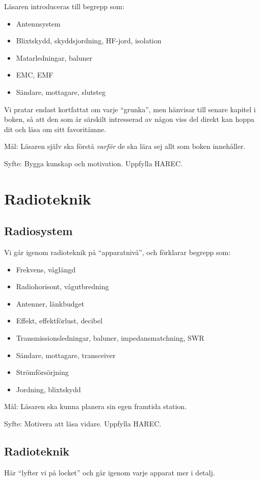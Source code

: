 \documentclass[a4paper,twoside,openright]{book}
\begin{document}
Läsaren introduceras till begrepp som:
\begin{itemize}
\item Antennsystem
\item Blixtskydd, skyddsjordning, HF-jord, isolation
\item Matarledningar, baluner
\item EMC, EMF
\item Sändare, mottagare, slutsteg
\end{itemize}

Vi pratar endast kortfattat om varje ``grunka'', men hänvisar till
senare kapitel i boken, så att den som är särskilt intresserad av
någon viss del direkt kan hoppa dit och läsa om sitt favoritämne.

Mål: Läsaren själv ska förstå \emph{varför} de ska lära sej allt som
boken innehåller.

Syfte: Bygga kunskap och motivation. Uppfylla HAREC.

\part{Radioteknik}

\chapter{Radiosystem}
Vi går igenom radioteknik på ``apparatnivå'', och förklarar begrepp som:
\begin{itemize}
\item Frekvens, våglängd
\item Radiohorisont, vågutbredning
\item Antenner, länkbudget
\item Effekt, effektförlust, decibel
\item Transmissionsledningar, baluner, impedansmatchning, SWR
\item Sändare, mottagare, transceiver
\item Strömförsörjning
\item Jordning, blixtskydd
\end{itemize}

Mål: Läsaren ska kunna planera sin egen framtida station.

Syfte: Motivera att läsa vidare. Uppfylla HAREC.

\chapter{Radioteknik}
\label{radioteknik}
Här ``lyfter vi på locket'' och går igenom varje apparat mer i detalj.
\end{document}
